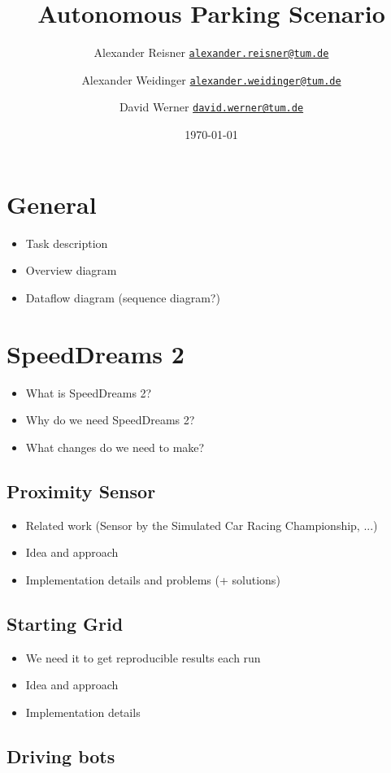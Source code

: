\documentclass[paper=a4, fontsize=11pt]{scrartcl}
\title{Autonomous Parking Scenario}
\author{Alexander Reisner \href{mailto:alexander.reisner@tum.de}{\texttt{alexander.reisner@tum.de}} \and
Alexander Weidinger \href{mailto:alexander.weidinger@tum.de}{\texttt{alexander.weidinger@tum.de}} \and
David Werner \href{mailto:david.werner@tum.de}{\texttt{david.werner@tum.de}}}
\date{\today}
\begin{document}
\maketitle
\newpage

\tableofcontents
\newpage

\section{General}
\begin{itemize}
  \item Task description
  \item Overview diagram
  \item Dataflow diagram (sequence diagram?)
\end{itemize}
\section{SpeedDreams 2}
\begin{itemize}
  \item What is SpeedDreams 2?
  \item Why do we need SpeedDreams 2?
  \item What changes do we need to make?
\end{itemize}
\subsection{Proximity Sensor}
\begin{itemize}
  \item Related work (Sensor by the Simulated Car Racing Championship, ...)
  \item Idea and approach
  \item Implementation details and problems (+ solutions)
\end{itemize}
\subsection{Starting Grid}
\begin{itemize}
  \item We need it to get reproducible results each run
  \item Idea and approach
  \item Implementation details
\end{itemize}
\subsection{Driving bots}
\end{document}

